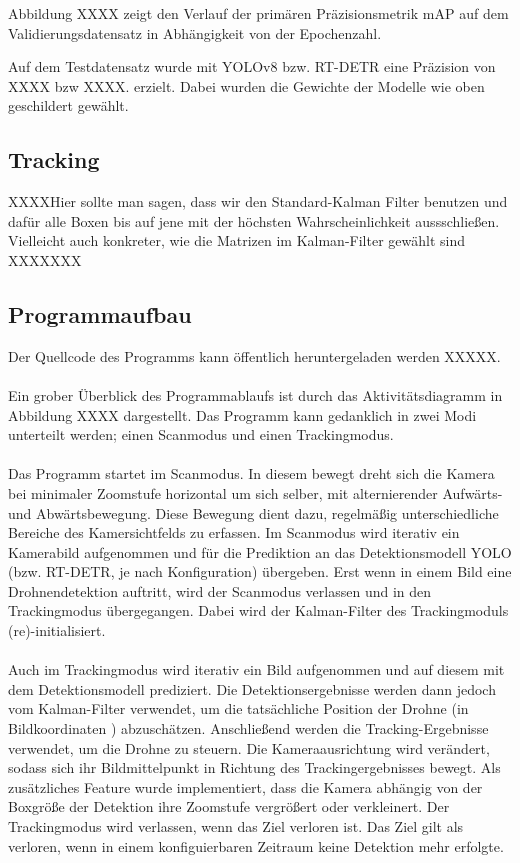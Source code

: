 \documentclass[runningheads]{llncs}
\begin{document}
Abbildung XXXX zeigt den Verlauf der primären Präzisionsmetrik mAP auf dem Validierungsdatensatz in Abhängigkeit von der Epochenzahl.

Auf dem Testdatensatz wurde mit YOLOv8 bzw. RT-DETR eine Präzision von XXXX bzw XXXX. erzielt. Dabei wurden die Gewichte der Modelle wie oben geschildert gewählt.

\subsection{Tracking}

XXXXHier sollte man sagen, dass wir den Standard-Kalman Filter benutzen und dafür alle Boxen bis auf jene mit der höchsten Wahrscheinlichkeit aussschließen. Vielleicht auch konkreter, wie die Matrizen im Kalman-Filter gewählt sind XXXXXXX

\subsection{Programmaufbau}

Der Quellcode des Programms kann öffentlich heruntergeladen werden XXXXX.\\\\

Ein grober Überblick des Programmablaufs ist durch das Aktivitätsdiagramm in Abbildung XXXX dargestellt. Das Programm kann gedanklich in zwei Modi unterteilt werden; einen Scanmodus und einen Trackingmodus.\\\\ Das Programm startet im Scanmodus. In diesem bewegt dreht sich die Kamera bei minimaler Zoomstufe horizontal um sich selber, mit alternierender Aufwärts- und Abwärtsbewegung. Diese Bewegung dient dazu, regelmäßig unterschiedliche Bereiche des Kamersichtfelds zu erfassen. Im Scanmodus wird iterativ ein Kamerabild aufgenommen und für die Prediktion an das Detektionsmodell YOLO (bzw. RT-DETR, je nach Konfiguration) übergeben. Erst wenn in einem Bild eine Drohnendetektion auftritt, wird der Scanmodus verlassen und in den Trackingmodus übergegangen. Dabei wird der Kalman-Filter des Trackingmoduls (re)-initialisiert.\\\\
Auch im Trackingmodus wird iterativ ein Bild aufgenommen und auf diesem mit dem Detektionsmodell prediziert. Die Detektionsergebnisse werden dann jedoch vom Kalman-Filter verwendet, um die tatsächliche Position der Drohne (in Bildkoordinaten ) abzuschätzen. Anschließend werden die Tracking-Ergebnisse verwendet, um die Drohne zu steuern. Die Kameraausrichtung wird verändert, sodass sich ihr Bildmittelpunkt in Richtung des Trackingergebnisses bewegt. Als zusätzliches Feature wurde implementiert, dass die Kamera abhängig von der Boxgröße der Detektion ihre Zoomstufe vergrößert oder verkleinert. Der Trackingmodus wird verlassen, wenn das Ziel verloren ist. Das Ziel gilt als verloren, wenn in einem konfiguierbaren Zeitraum keine Detektion mehr erfolgte.\\\\
\end{document}
